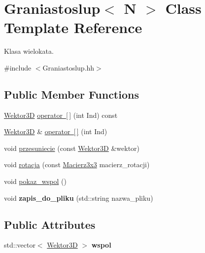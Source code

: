 \hypertarget{class_graniastoslup}{}\section{Graniastoslup$<$ N $>$ Class Template Reference}
\label{class_graniastoslup}


Klasa wielokata.  




{\ttfamily \#include $<$Graniastoslup.\+hh$>$}

\subsection*{Public Member Functions}
\begin{DoxyCompactItemize}
\item 
\mbox{\hyperlink{class_wektor}{Wektor3D}} \mbox{\hyperlink{class_graniastoslup_a239b423d347cc3de286b805b564997b2}{operator \mbox{[}$\,$\mbox{]}}} (int Ind) const
\item 
\mbox{\hyperlink{class_wektor}{Wektor3D}} \& \mbox{\hyperlink{class_graniastoslup_a418130dab87451971818f266d45794a4}{operator \mbox{[}$\,$\mbox{]}}} (int Ind)
\item 
void \mbox{\hyperlink{class_graniastoslup_a04c0502602c08af631400dac59c341c6}{przesuniecie}} (const \mbox{\hyperlink{class_wektor}{Wektor3D}} \&wektor)
\item 
void \mbox{\hyperlink{class_graniastoslup_a701f6fe18e914843ed32e7ea9dd9e433}{rotacja}} (const \mbox{\hyperlink{class_macierz}{Macierz3x3}} macierz\+\_\+rotacji)
\item 
void \mbox{\hyperlink{class_graniastoslup_a875091773ddc3f77f03d44829ce211e6}{pokaz\+\_\+wspol}} ()
\item 
\mbox{\label{class_graniastoslup_a86e09003fa136641499279364d3a7c30}} 
void {\bfseries zapis\+\_\+do\+\_\+pliku} (std\+::string nazwa\+\_\+pliku)
\end{DoxyCompactItemize}
\subsection*{Public Attributes}
\begin{DoxyCompactItemize}
\item 
\mbox{\label{class_graniastoslup_aa05502340b49149272b3750228a45cc5}} 
std\+::vector$<$ \mbox{\hyperlink{class_wektor}{Wektor3D}} $>$ {\bfseries wspol}
\end{DoxyCompactItemize}
